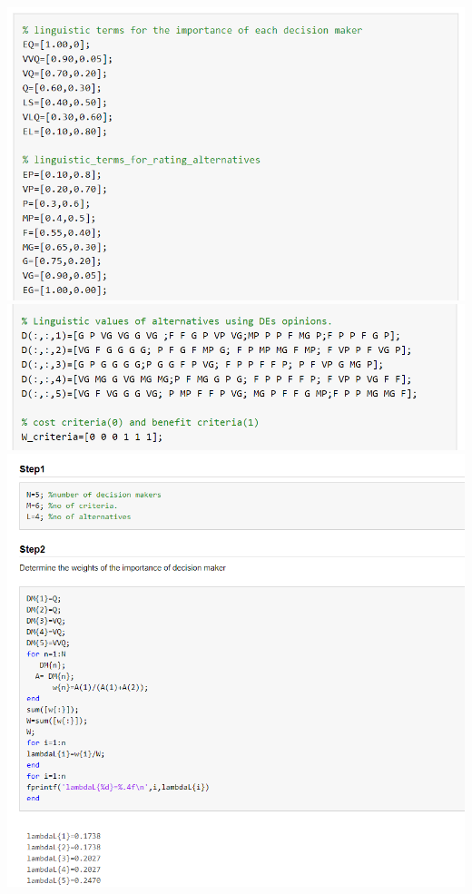 \begin{flushleft}
 
\includegraphics[width = 15cm]{config/pictures/newling1.png}
\includegraphics[width = 15cm]{config/pictures/newling2.png}
\includegraphics[width = 16cm]{config/pictures/image11.png}  

\end{flushleft}
